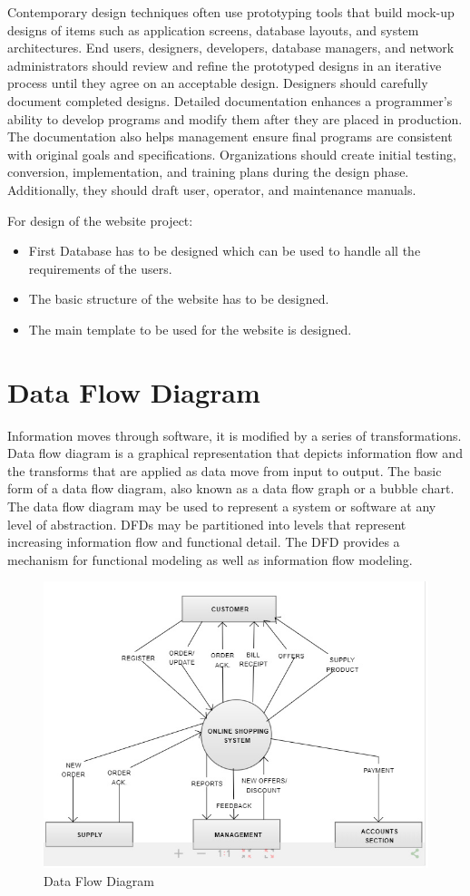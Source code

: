 Contemporary design techniques often use prototyping tools that build mock-up designs of items such as application screens, database layouts, and system architectures. End users, designers, developers, database managers, and network administrators should review and refine the prototyped designs in an iterative process until they agree on an acceptable design.
Designers should carefully document completed designs. Detailed documentation enhances a programmer’s ability to develop programs and modify them after they are placed in production. The documentation also helps management ensure final programs are consistent with original goals and specifications. Organizations should create initial testing, conversion, implementation, and training plans during the design phase. Additionally, they should draft user, operator, and maintenance manuals.

For design of the website project:
\begin{itemize}
	\item First Database has to be designed which can be used to handle all the requirements of the users.
	\item The basic structure of the website has to be designed.  
	\item The main template to be used for the website is designed.
\end{itemize}

\section{Data Flow Diagram}
Information moves through software, it is modified by a series of transformations. Data flow diagram is a graphical representation that depicts information flow and the transforms that are applied as data move from input to output. The basic form of a data flow diagram, also known as a data flow graph or a bubble chart.
The data flow diagram may be used to represent a system or software at any level of abstraction. DFDs may be partitioned into levels that represent increasing information flow and functional detail. The DFD provides a mechanism for functional modeling as well as information flow modeling.
\begin{figure}[ht]
\centering
\includegraphics[scale=0.40]{images/pil.png}
\caption{Data Flow Diagram}
\end{figure}

